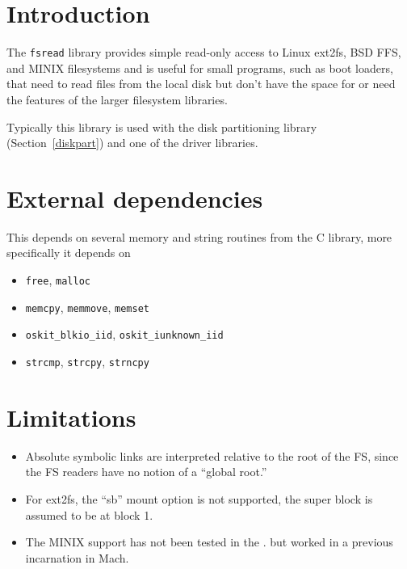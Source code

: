 %
% 
%
\label{fsread}

\section{Introduction}

The \texttt{fsread} library provides simple read-only access to
Linux ext2fs, BSD FFS, and MINIX filesystems and is useful for small programs,
such as boot loaders, that need to read files from the local disk but
don't have the space for or need the features of the larger \oskit{}
filesystem libraries.

Typically this library is used with the disk partitioning library
(Section~\ref{diskpart}) and one of the driver libraries.

\section{External dependencies}

This depends on several memory and string routines from the \oskit{} C library,
more specifically it depends on

\begin{itemize}
\item \texttt{free}, \texttt{malloc}
\item \texttt{memcpy}, \texttt{memmove}, \texttt{memset}
\item \texttt{oskit_blkio_iid}, \texttt{oskit_iunknown_iid}
\item \texttt{strcmp}, \texttt{strcpy}, \texttt{strncpy} 
\end{itemize}

\section{Limitations}

\begin{itemize}
\item Absolute symbolic links are interpreted relative to the root of the FS,
      since the FS readers have no notion of a ``global root.''
\item For ext2fs, the ``sb'' mount option is not supported,
      the super block is assumed to be at block 1.
\item The MINIX support has not been tested in the \oskit{}.
      but worked in a previous incarnation in Mach.
\end{itemize}


